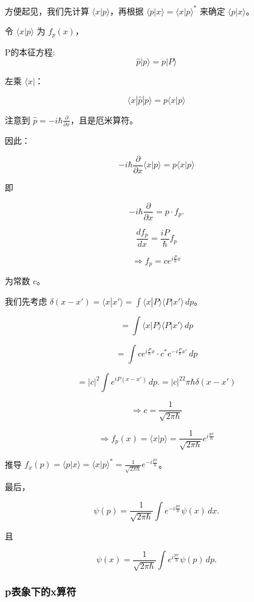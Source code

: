\documentclass[lang=cn,10pt]{elegantbook}
\begin{document}
方便起见，我们先计算 $\langle x | p \rangle$，再根据 $\langle p | x \rangle = \langle x | p \rangle^*$ 来确定 $\langle p | x \rangle$。

令 $\langle x | p \rangle$ 为 $f_p(x)$，


P的本征方程:
\[
\hat{p} | p \rangle = p | P \rangle
\]

左乘 $\langle x |$：

\[
\langle x | \hat{p} | p \rangle = p \langle x | p \rangle
\]

注意到 $\hat{p} = -i\hbar \frac{\partial}{\partial x}$，且是厄米算符。

因此：

\[
-i\hbar \frac{\partial}{\partial x} \langle x | p \rangle = p \langle x | p \rangle
\]

即 

\[
-i\hbar \frac{\partial}{\partial x}= p \cdot f_p.
\]

\[
\frac{df_p}{dx} = \frac{iP}{\hbar} f_p
\]

\[
\Rightarrow f_p = c e^{i \frac{P}{\hbar} x}
\]

为常数 $c$。

我们先考虑 $\delta(x - x') = \langle x | x' \rangle = \int \langle x | P \rangle \langle P | x' \rangle \, dp$。

\[
= \int \langle x | P \rangle \langle P | x' \rangle \, dp
\]

\[
= \int c e^{i \frac{P}{\hbar} x} \cdot c^* e^{-i \frac{P}{\hbar} x'} \, dp
\]

\[
= |c|^2 \int e^{i P (x - x')} \, dp.=|c|^22\pi\hbar\delta(x-x')
\]

\[
\Rightarrow c = \frac{1}{\sqrt{2\pi \hbar}}
\]

\[
\Rightarrow f_p(x) = \langle x | p \rangle = \frac{1}{\sqrt{2\pi \hbar}} e^{i \frac{p x}{\hbar}}
\]

推导 $f_x(p) = \langle p | x \rangle = \langle x | p \rangle^* = \frac{1}{\sqrt{2\pi \hbar}} e^{-i \frac{p x}{\hbar}}$。

最后，

\[
\psi(p) = \frac{1}{\sqrt{2\pi \hbar}} \int e^{-i \frac{p x}{\hbar}} \psi(x) \, dx.
\]

且

\[
\psi(x) = \frac{1}{\sqrt{2\pi \hbar}} \int e^{i \frac{p x}{\hbar}} \psi(p) \, dp.
\]

\subsubsection{p表象下的x算符}
\end{document}
